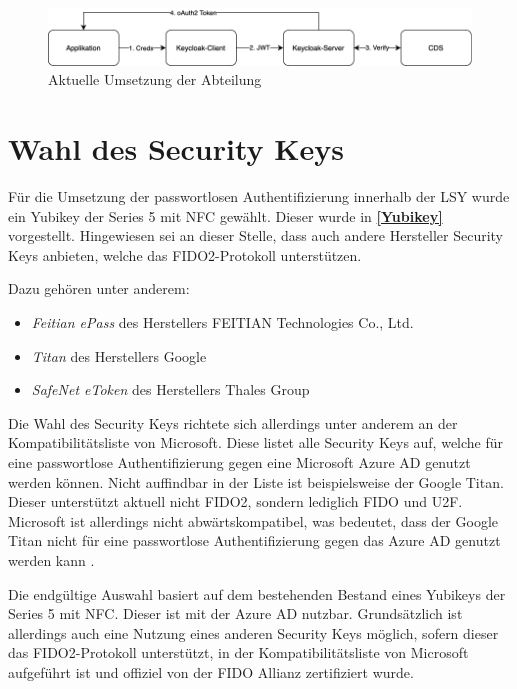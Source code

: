 \begin{figure}[h]
	\centering 
	\includegraphics[width=1\textwidth]{img/abbildungen/Unknown.png}
	\captionsetup{format=hang}
	\caption{Aktuelle Umsetzung der Abteilung} \label{current-imp}
\end{figure}

\section{Wahl des Security Keys} \label{secwahl}
Für die Umsetzung der passwortlosen Authentifizierung innerhalb der \ac{LSY} wurde ein Yubikey der Series 5 mit NFC gewählt. Dieser wurde in \textbf{\ref{Yubikey}} vorgestellt. Hingewiesen sei an dieser Stelle, dass auch andere Hersteller Security Keys anbieten, welche das FIDO2-Protokoll unterstützen. 

Dazu gehören unter anderem:
\begin{itemize}
    \item \textit{Feitian ePass} des Herstellers FEITIAN Technologies Co., Ltd.
    \item \textit{Titan} des Herstellers Google
    \item \textit{SafeNet eToken} des Herstellers Thales Group
\end{itemize}

Die Wahl des Security Keys richtete sich allerdings unter anderem an der Kompatibilitätsliste \cite{compWin} von Microsoft. Diese listet alle Security Keys auf, welche für eine passwortlose Authentifizierung gegen eine Microsoft Azure \ac{AD} genutzt werden können. Nicht auffindbar in der Liste ist beispielsweise der Google Titan. Dieser unterstützt aktuell nicht FIDO2, sondern lediglich FIDO und \ac{U2F}. Microsoft ist allerdings nicht abwärtskompatibel, was bedeutet, dass der Google Titan nicht für eine passwortlose Authentifizierung gegen das Azure \ac{AD} genutzt werden kann .

Die endgültige Auswahl basiert auf dem bestehenden Bestand eines Yubikeys der Series 5 mit NFC. Dieser ist mit der Azure \ac{AD} nutzbar. Grundsätzlich ist allerdings auch eine Nutzung eines anderen Security Keys möglich, sofern dieser das \ac{FIDO}2-Protokoll unterstützt, in der Kompatibilitätsliste von Microsoft aufgeführt ist und offiziel von der \ac{FIDO} Allianz zertifiziert wurde.

